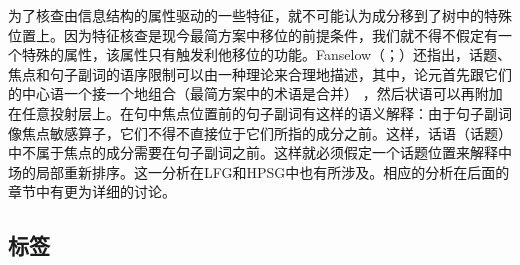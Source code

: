 为了核查由信息结构的属性驱动的一些特征，就不可能认为成分移到了树中的特殊位置上。因为特征核查是现今最简方案中移位的前提条件，我们就不得不假定有一个特殊的属性，该属性只有触发利他移位的功能。Fanselow（\citeyear[\S~4]{Fanselow2003b}；\citeyear[]{Fanselow2006a}）还指出，话题、焦点和句子副词的语序限制可以由一种理论来合理地描述，其中，论元首先跟它们的中心语一个接一个地组合（最简方案中的术语是合并）
，然后状语可以再附加在任意投射层上。在句中焦点位置前的句子副词有这样的语义解释：由于句子副词像焦点敏感算子，它们不得不直接位于它们所指的成分之前。这样，话语（话题）中不属于焦点的成分需要在句子副词之前。这样就必须假定一个话题位置来解释中场的局部重新排序。这一分析在LFG\indexlfg 和HPSG\indexhpsg 中也有所涉及。相应的分析在后面的章节中有更为详细的讨论。
%

\subsection{标签}
\label{Abschnitt-Labeling}

